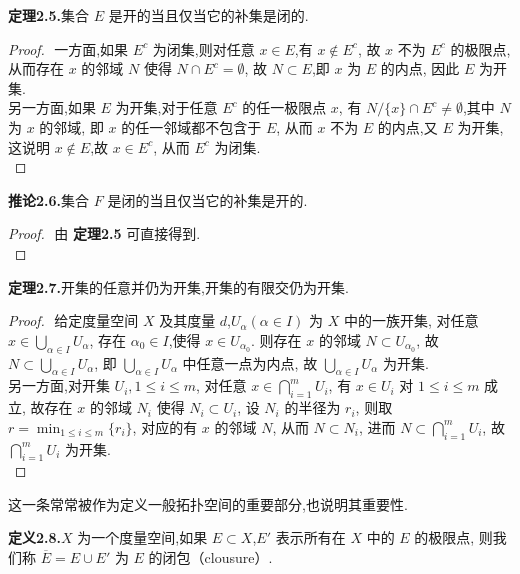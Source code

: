 \documentclass{article}
\begin{document}
\textbf{定理2.5.}集合 $E$ 是开的当且仅当它的补集是闭的.
\begin{proof}
    $ $
    一方面,如果 $E^c$ 为闭集,则对任意 $x\in E$,有 $x \notin E^c$,
    故 $x$ 不为 $E^c$ 的极限点,
    从而存在 $x$ 的邻域 $N$ 使得 $N\cap E^c = \emptyset$,
    故 $N\subset E$,即 $x$ 为 $E$ 的内点,
    因此 $E$ 为开集.\\
    另一方面,如果 $E$ 为开集,对于任意 $E^c$ 的任一极限点 $x$,
    有 $N/\{x\} \cap E^c \neq \emptyset$,其中 $N$ 为 $x$ 的邻域,
    即 $x$ 的任一邻域都不包含于 $E$,
    从而 $x$ 不为 $E$ 的内点,又 $E$ 为开集,
    这说明 $x\notin E$,故 $x\in E^c$,
    从而 $E^c$ 为闭集.\\
\end{proof}
\textbf{推论2.6.}集合 $F$ 是闭的当且仅当它的补集是开的.
\begin{proof}
    $ $
    由 \textbf{定理2.5} 可直接得到.\\
\end{proof}

\textbf{定理2.7.}开集的任意并仍为开集,开集的有限交仍为开集.
\begin{proof}
    $ $
    给定度量空间 $X$ 及其度量 $d$,$U_\alpha(\alpha \in I)$ 为 $X$ 中的一族开集,
    对任意 $x\in \bigcup\limits_{\alpha\in I}U_\alpha$,
    存在 $\alpha_0\in I$,使得 $x\in U_{\alpha_0}$.
    则存在 $x$ 的邻域 $N\subset U_{\alpha_0}$,
    故 $N\subset \bigcup\limits_{\alpha\in I}U_\alpha$,
    即 $\bigcup\limits_{\alpha\in I}U_\alpha$ 中任意一点为内点,
    故 $\bigcup\limits_{\alpha\in I}U_\alpha$ 为开集.\\
    另一方面,对开集 $U_i,1\leq i\leq m$,
    对任意 $x\in \bigcap\limits_{i = 1}^m U_i$,
    有 $x\in U_i$ 对 $1\leq i\leq m$ 成立,
    故存在 $x$ 的邻域 $N_i$ 使得 $N_i\subset U_i$,
    设 $N_i$ 的半径为 $r_i$,
    则取 $r = \min_{1\leq i\leq m}\{r_i\}$,
    对应的有 $x$ 的邻域 $N$,
    从而 $N\subset N_i$,
    进而 $N\subset \bigcap\limits_{i = 1}^m U_i$,
    故 $\bigcap\limits_{i = 1}^m U_i$ 为开集.\\
\end{proof}

这一条常常被作为定义一般拓扑空间的重要部分,也说明其重要性.

\textbf{定义2.8.}$X$ 为一个度量空间,如果 $E\subset X$,$E'$ 表示所有在 $X$ 中的 $E$ 的极限点,
则我们称 $\overline{E} = E\cup E'$ 为 $E$ 的闭包（clousure）.
\end{document}
